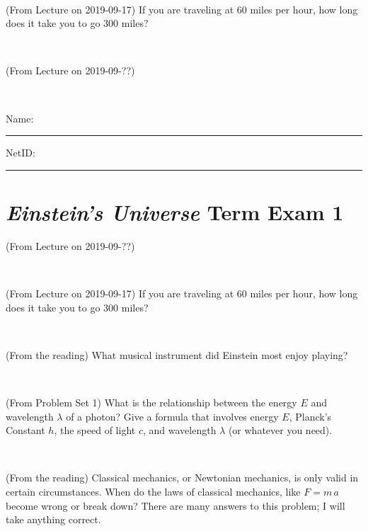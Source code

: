 \documentclass[12pt, letterpaper]{article}
\begin{document}
\vfill ~

\begin{problem} (From Lecture on 2019-09-17)
If you are traveling at 60 miles per hour, how long does
it take you to go 300 miles?
\end{problem}


\vfill ~

\begin{problem} (From Lecture on 2019-09-??)
\end{problem}


\vfill ~


\cleardoublepage



\noindent
Name: \rule[-1ex]{0.60\textwidth}{0.1pt}
NetID: \rule[-1ex]{0.20\textwidth}{0.1pt}

\section*{\textsl{Einstein's Universe} Term Exam 1}
\setcounter{problem}{1}


\begin{problem} (From Lecture on 2019-09-??)
\end{problem}


\vfill ~

\begin{problem} (From Lecture on 2019-09-17)
If you are traveling at 60 miles per hour, how long does
it take you to go 300 miles?
\end{problem}


\vfill ~

\begin{problem} (From the reading)
What musical instrument did Einstein most enjoy playing?
\end{problem}


\vfill ~

\begin{problem} (From Problem Set 1)
What is the relationship between the energy $E$ and wavelength
$\lambda$ of a photon? Give a formula that involves energy $E$,
Planck's Constant $h$, the speed of light $c$, and wavelength
$\lambda$ (or whatever you need).
\end{problem}

\vfill ~


\clearpage


\begin{problem} (From the reading)
Classical mechanics, or Newtonian mechanics, is only valid in certain
circumstances. When do the laws of classical mechanics, like $F =
m\,a$ become wrong or break down? There are many answers to this
problem; I will take anything correct.
\end{problem}
\end{document}
